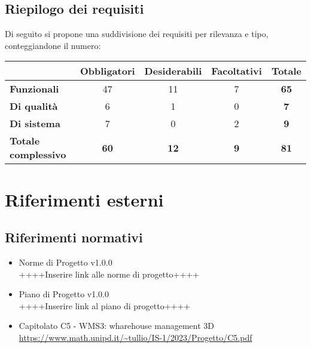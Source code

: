 \subsection{Riepilogo dei requisiti}\label{subsec:riepilogo}
Di seguito si propone una suddivisione dei requisiti per rilevanza e tipo, conteggiandone il numero:

\begin{table}[h]
    \centering
    \renewcommand\tabularxcolumn[1]{m{#1}} %
    \renewcommand{\arraystretch}{1.5}
    \begin{tabular}{|l|c|c|c||c|}
        \hline
        \rowcolor{black}
        \multicolumn{1}{|c|}{\cellcolor{white}Tipo\textbackslash Priorità} & \textbf{\color{white}Obbligatori} & \textbf{\color{white}Desiderabili} & \textbf{\color{white}Facoltativi} & \textbf{\color{white}Totale}\\ 
        \hline

        \cellcolor{black} \textbf{\color{white}Funzionali} & 47 & 11 & 7 & \textbf{65}\\
        \cellcolor{black} \textbf{\color{white}Di qualità} & 6 & 1 & 0 & \textbf{7}\\
        \cellcolor{black} \textbf{\color{white}Di sistema} & 7 & 0 & 2 & \textbf{9}\\

        \hline\hline
        \cellcolor{black} \textbf{\color{white}Totale complessivo} & \textbf{60} & \textbf{12} & \textbf{9} & \textbf{81}\\
        \hline
    \end{tabular}
\end{table}


\newpage
\section{Riferimenti esterni}\label{sec:riferimenti}

\subsection{Riferimenti normativi}\label{sec:riferimenti_normativi}
\begin{itemize}
    \item Norme di Progetto v1.0.0 \\
    ++++Inserire link alle norme di progetto++++
    \item Piano di Progetto v1.0.0 \\
    ++++Inserire link al piano di progetto++++
    \item Capitolato C5 - WMS3: wharehouse management 3D \\
    \url{https://www.math.unipd.it/~tullio/IS-1/2023/Progetto/C5.pdf}
\end{itemize}

